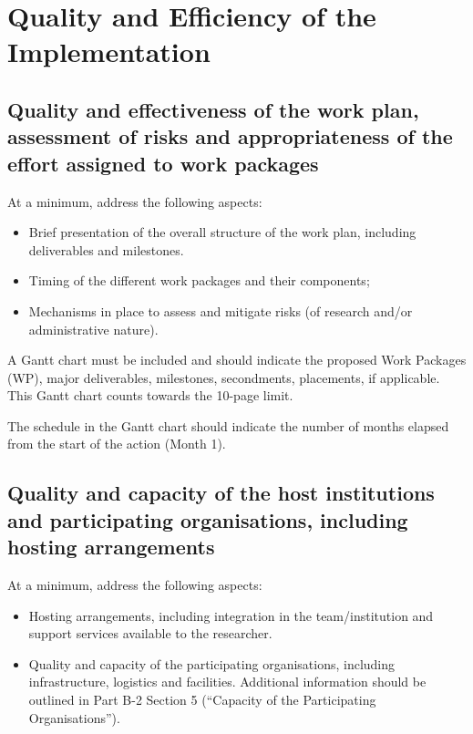\documentclass[11pt,draftproposal]{msca-pf}
\begin{document}
 

\section{Quality and Efficiency of the Implementation
            }
\label{sc:implementation}

\subsection{Quality and effectiveness of the work plan, assessment of risks and
appropriateness of the effort assigned to work packages}
\label{ssc:implementation:workplan}

At a minimum, address the following aspects:

\begin{itemize}
    \item Brief presentation of the overall structure of the work plan,
    including deliverables and milestones.

    \item Timing of the different work packages and their components;

    \item Mechanisms in place to assess and mitigate risks (of research and/or
    administrative nature).
\end{itemize}

A Gantt chart must be included and should indicate the proposed Work Packages
(WP), major deliverables, milestones, secondments, placements, if applicable.
This Gantt chart counts towards the 10-page limit.

The schedule in the Gantt chart should indicate the number of months elapsed
from the start of the action (Month 1).

\subsection{Quality and capacity of the host institutions and participating
organisations, including hosting arrangements}
\label{ssc:implementation:host}

At a minimum, address the following aspects:

\begin{itemize}
    \item Hosting arrangements, including integration in the team/institution
    and support services available to the researcher.

    \item Quality and capacity of the participating organisations, including
    infrastructure, logistics and facilities. Additional information should be
    outlined in Part B-2 Section 5 (``Capacity of the Participating Organisations'').
\end{itemize}
\end{document}
